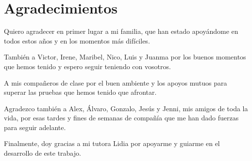 \chapter*{Agradecimientos}

Quiero agradecer en primer lugar a mi familia, que han estado apoyándome en todos estos años y en los momentos más difíciles. 

También a Victor, Irene, Maribel, Nico, Luis y Juanma por los buenos momentos que hemos tenido y espero seguir teniendo con vosotros. 

A mis compañeros de clase por el buen ambiente y los apoyos mutuos para superar las pruebas que hemos tenido que afrontar.

Agradezco también a Alex, Álvaro, Gonzalo, Jesús y Jenni, mis amigos de toda la vida, por esas tardes y fines de semanas de compañía que me han dado fuerzas para seguir adelante.

Finalmente, doy gracias a mi tutora Lidia por apoyarme y guiarme en el desarrollo de este trabajo.